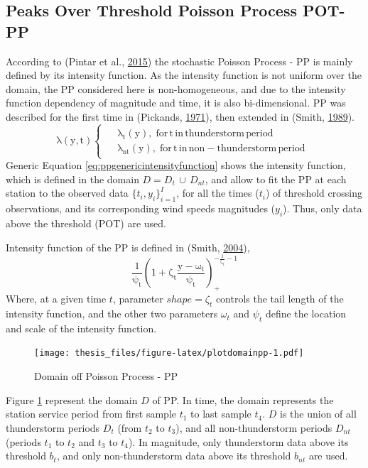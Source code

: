 \documentclass[12pt,oneside]{reedthesis}
\begin{document}
\hypertarget{method-pot-pp}{%
\subsection{Peaks Over Threshold Poisson Process POT-PP}\label{method-pot-pp}}

According to (Pintar et al., \protect\hyperlink{ref-Pintar2015}{2015}) the stochastic Poisson Process - PP is mainly defined by its intensity function. As the intensity function is not uniform over the domain, the PP considered here is non-homogeneous, and due to the intensity function dependency of magnitude and time, it is also bi-dimensional. PP was described for the first time in (Pickands, \protect\hyperlink{ref-Pickands1971}{1971}), then extended in (Smith, \protect\hyperlink{ref-Smith1989}{1989}).
\begin{equation}
  \mathrm{
    \lambda\left(y,t\right)
    \begin{cases}
      \begin{split}
            &\lambda_t(y),\;for\,t\,in\,thunderstorm\,period
            \\
            &\lambda_{nt}(y),\;for\,t\,in\,non-thunderstorm\,period      
      \end{split}
    \end{cases}
  }
  \label{eq:ppgenericintensityfunction}
\end{equation}
Generic Equation \eqref{eq:ppgenericintensityfunction} shows the intensity function, which is defined in the domain \(D = D_t\,{\cup}\,D_{nt}\), and allow to fit the PP at each station to the observed data \(\{t_i, y_i\}_{i=1}^I\), for all the times (\(t_i\)) of threshold crossing observations, and its corresponding wind speeds magnitudes (\(y_i\)). Thus, only data above the threshold (POT) are used.

Intensity function of the PP is defined in (Smith, \protect\hyperlink{ref-Smith2004}{2004}),
\begin{equation}
  \mathrm{
    \frac{1}{\psi_t}\left(1+\zeta_t\frac{y-\omega_t}{\psi_t}\right)_+^{-\frac{1}{\zeta_t}-1}
  }
  \label{eq:ppintensityfunction}
\end{equation}
Where, at a given time \(t\), parameter \(shape = \zeta_t\) controls the tail length of the intensity function, and the other two parameters \(\omega_t\) and \(\psi_t\) define the location and scale of the intensity function.
\begin{figure}
\centering
\texttt{[image: thesis\_files/figure-latex/plotdomainpp-1.pdf]}
\caption{\label{fig:plotdomainpp}Domain off Poisson Process - PP}
\end{figure}
Figure \ref{fig:plotdomainpp} represent the domain \(D\) of PP. In time, the domain represents the station service period from first sample \(t_1\) to last sample \(t_4\). \(D\) is the union of all thunderstorm periods \(D_t\) (from \(t_2\) to \(t_3\)), and all non-thunderstorm periods \(D_{nt}\) (periods \(t_1\) to \(t_2\) and \(t_3\) to \(t_4\)). In magnitude, only thunderstorm data above its threshold \(b_t\), and only non-thunderstorm data above its threshold \(b_{nt}\) are used.
\end{document}
